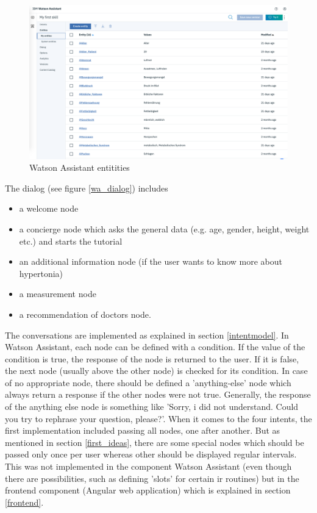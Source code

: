 \begin{figure}[h!]
	\centering
	\includegraphics[width=1\textwidth]{images/WA_entities.png}
	\caption{Watson Assistant entitities}
	\label{wa_entities}
\end{figure}
The dialog (see figure \ref{wa_dialog}) includes 

\begin{itemize}
\setlength\itemsep{-0.5em}
  \item a welcome node
  \item a concierge node which asks the general data (e.g. age, gender, height, weight etc.) and starts the tutorial
  \item an additional information node (if the user wants to know more about hypertonia)
  \item a measurement node
  \item a recommendation of doctors node.
\end{itemize}

The conversations are implemented as explained in section \ref{intentmodel}. In Watson Assistant, each node can be defined with a condition. If the value of the condition is true, the response of the node is returned to the user. If it is false, the next node (usually above the other node) is checked for its condition. In case of no appropriate node, there should be defined a 'anything-else' node which always return a response if the other nodes were not true. Generally, the response of the anything else node is something like 'Sorry, i did not understand. Could you try to rephrase your question, please?'.
When it comes to the four intents, the first implementation included passing all nodes, one after another. But as mentioned in section \ref{first_ideas}, there are some special nodes which should be passed only once per user whereas other should be displayed regular intervals. This was not implemented in the component Watson Assistant (even though there are possibilities, such as defining 'slots' for certain \ac{ir} routines) but in the frontend component (Angular web application) which is explained in section \ref{frontend}. 

